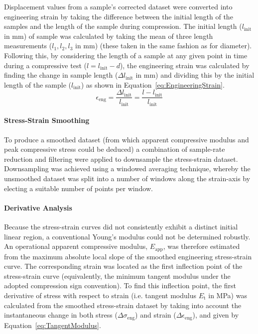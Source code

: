 Displacement values from a sample's corrected dataset were converted into
 engineering strain by taking the difference between the initial length of 
 the samples and the length of the sample during compression.
The initial length (\(l_{\mathrm{init}}\) in \unit{\milli\metre}) of sample 
 was calculated by taking the mean of three length measurements 
 (\(l_{1},l_{2},l_{3}\) in \unit{\milli\metre}) (these taken in the same 
 fashion as for diameter).
Following this, by considering the length of a sample at any given point
 in time during a compressive test (\(l = l_{\mathrm{init}}-d\)), the
 engineering strain was calculated by finding the 
 change in sample length (\(\Delta l_{\mathrm{init}}\) in 
 \unit{\milli\metre}) and dividing this by the initial length of the
 sample (\(l_{\mathrm{init}}\)) as shown in 
 Equation~\ref{eq:EngineeringStrain}.
\begin{equation}\label{eq:EngineeringStrain}
    \epsilon _{\mathrm{eng}}=\frac{\Delta l_{\mathrm{init}}}{l_{\mathrm{init}}}=\frac{l-l_{\mathrm{init}}}{l_{\mathrm{init}}}
\end{equation}

\paragraph{Stress-Strain Smoothing}
To produce a smoothed dataset (from which apparent compressive modulus and 
 peak compressive stress could be deduced) a combination of sample-rate
 reduction and filtering were applied to downsample the stress-strain dataset.
Downsampling was achieved using a windowed averaging technique, whereby
 the unsmoothed dataset was split  into a number of windows along
 the strain-axis by electing a suitable number of points per
 window.

\paragraph{Derivative Analysis}
Because the stress-strain curves did not consistently exhibit a distinct initial
 linear region, a conventional Young's modulus could not be determined robustly.
An operational apparent compressive modulus, \(E_{\text{app}}\), was therefore
 estimated from the maximum absolute local slope of the smoothed engineering 
 stress-strain curve.
The corresponding strain was located as the first inflection point of the
 stress-strain curve (equivalently, the minimum tangent modulus under the 
 adopted compression sign convention).
To find this inflection point, the first derivative of stress with respect
 to strain (i.e. tangent modulus \(E_{\mathrm{t}}\) in \unit{\mega\pascal}) was calculated
 from the smoothed stress-strain dataset by
 taking into account the instantaneous change in both stress (\(\Delta
 \sigma_{\mathrm{eng}}\)) and strain (\(\Delta \epsilon_{\mathrm{eng}}\)), and
 given by Equation~\ref{eq:TangentModulus}.


